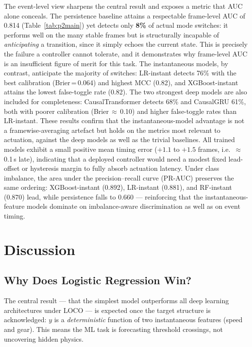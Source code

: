 \documentclass[conference,a4paper]{IEEEtran}
\begin{document}
The event-level view sharpens the central result and exposes a metric that AUC alone
conceals. The persistence baseline attains a respectable frame-level AUC of 0.814
(Table~\ref{tab:p2main}) yet detects only \textbf{8\%} of actual mode switches: it
performs well on the many stable frames but is structurally incapable of
\emph{anticipating} a transition, since it simply echoes the current state.
This is precisely the failure a controller cannot tolerate, and it demonstrates why
frame-level AUC is an insufficient figure of merit for this task.
The instantaneous models, by contrast, anticipate the majority of switches: LR-instant
detects 76\% with the best calibration (Brier\,=\,0.064) and highest MCC (0.82), and
XGBoost-instant attains the lowest false-toggle rate (0.82).
The two strongest deep models are also included for completeness: CausalTransformer detects
68\% and CausalGRU 61\%, both with poorer calibration (Brier\,$\approx$\,0.10) and higher
false-toggle rates than LR-instant. These results confirm that the instantaneous-model
advantage is not a framewise-averaging artefact but holds on the metrics most relevant to
actuation, against the deep models as well as the trivial baselines.
All trained models exhibit a small positive mean timing error ($+1.1$ to $+1.5$ frames,
i.e.\ $\approx$0.1\,s late), indicating that a deployed controller would need a modest
fixed lead-offset or hysteresis margin to fully absorb actuation latency.
Under class imbalance, the area under the precision--recall curve (PR-AUC) preserves the
same ordering: XGBoost-instant (0.892), LR-instant (0.881), and RF-instant (0.870) lead,
while persistence falls to 0.660 — reinforcing that the instantaneous-feature models
dominate on imbalance-aware discrimination as well as on event timing.

\section{Discussion}

\subsection{Why Does Logistic Regression Win?}

The central result — that the simplest model outperforms all deep learning
architectures under LOCO — is expected once the target structure is acknowledged:
$y$ is a \emph{deterministic} function of two instantaneous features (speed and gear).
This means the ML task is forecasting threshold crossings, not uncovering hidden physics.
\end{document}
